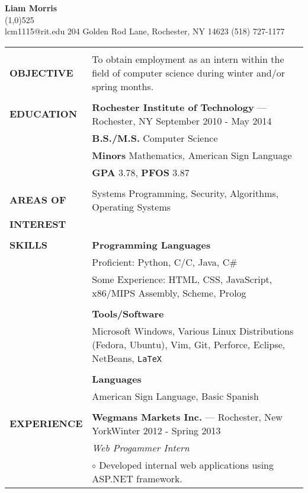 \documentclass[11pt,letterpaper]{article}
\newcommand{\CPP}
{C\nolinebreak[4]\hspace{-.05em}\raisebox{.22ex}{\footnotesize\bf ++}}
\begin{document}
\raggedright

\textbf{\huge{Liam Morris}}\\
\vspace{-8pt}
\line(1,0){525}\\
lcm1115@rit.edu \hfill 204 Golden Rod Lane, Rochester, NY 14623 \hfill (518)
727-1177\\
\vspace{5pt}

\begin{tabular}{@{}lp{6.2in}}
&\\
\textbf{OBJECTIVE}
&To obtain employment as an intern within the field of
computer science during winter and/or spring months.\\
&\\
\textbf{EDUCATION}
&\textbf{Rochester Institute of Technology} --- Rochester, NY \hfill September 2010 - May 2014\\
&\textbf{B.S./M.S.} Computer Science\\
&\textbf{Minors} Mathematics, American Sign Language\\
&\textbf{GPA} 3.78, \textbf{PFOS} 3.87\\
&\\
\textbf{AREAS OF}
&Systems Programming, Security, Algorithms, Operating Systems\\
\textbf{INTEREST}&\\
&\\
\textbf{SKILLS}
&\textbf{Programming Languages}\\
&Proficient: Python, C/\CPP, Java, C\#\\
&Some Experience: HTML, CSS, JavaScript, x86/MIPS Assembly, Scheme, Prolog\\
&\\
&\textbf{Tools/Software}\\
&Microsoft Windows, Various Linux Distributions (Fedora, Ubuntu), Vim, Git,
  Perforce, Eclipse, NetBeans, \texttt{\LaTeX}\\
&\\
&\textbf{Languages}\\
&American Sign Language, Basic Spanish\\
&\\
\textbf{EXPERIENCE}
&\textbf{Wegmans Markets Inc.} --- Rochester, New York\hfill Winter 2012 - Spring 2013\\
&\emph{Web Progammer Intern}\\
&\hspace{10pt}$\circ$ Developed internal web applications using ASP.NET framework.\\

\end{tabular}
\end{document}
